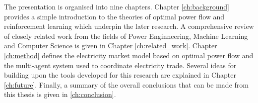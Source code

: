 The presentation is organised into nine chapters.  Chapter \ref{ch:background}
provides a simple introduction to the theories of optimal power flow and
reinforcement learning which underpin the later research.  A comprehensive
review of closely related work from the fields of Power Enginneering, Machine
Learning and Computer Science is given in Chapter \ref{ch:related_work}.
Chapter \ref{ch:method} defines the electricity market model based on optimal
power flow and the multi-agent system used to coordinate electricity trade.
Several ideas for building upon the tools developed for this research are
explained in Chapter \ref{ch:future}.  Finally, a summary of the overall
conclusions that can be made from this thesis is given in \ref{ch:conclusion}.





